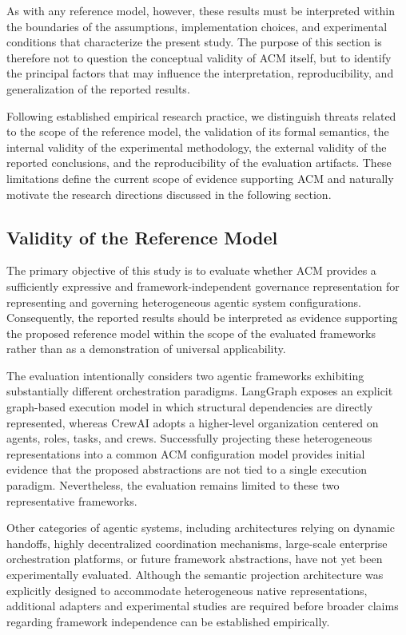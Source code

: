 \documentclass[10pt]{article}
\begin{document}
As with any reference model, however, these results must be interpreted within the boundaries of the assumptions, implementation choices, and experimental conditions that characterize the present study. The purpose of this section is therefore not to question the conceptual validity of ACM itself, but to identify the principal factors that may influence the interpretation, reproducibility, and generalization of the reported results.

Following established empirical research practice, we distinguish threats related to the scope of the reference model, the validation of its formal semantics, the internal validity of the experimental methodology, the external validity of the reported conclusions, and the reproducibility of the evaluation artifacts. These limitations define the current scope of evidence supporting ACM and naturally motivate the research directions discussed in the following section.

\subsection{Validity of the Reference Model}
\label{sec:validity_reference_model}

The primary objective of this study is to evaluate whether ACM provides a sufficiently expressive and framework-independent governance representation for representing and governing heterogeneous agentic system configurations. Consequently, the reported results should be interpreted as evidence supporting the proposed reference model within the scope of the evaluated frameworks rather than as a demonstration of universal applicability.

The evaluation intentionally considers two agentic frameworks exhibiting substantially different orchestration paradigms. LangGraph exposes an explicit graph-based execution model in which structural dependencies are directly represented, whereas CrewAI adopts a higher-level organization centered on agents, roles, tasks, and crews. Successfully projecting these heterogeneous representations into a common ACM configuration model provides initial evidence that the proposed abstractions are not tied to a single execution paradigm. Nevertheless, the evaluation remains limited to these two representative frameworks.

Other categories of agentic systems, including architectures relying on dynamic handoffs, highly decentralized coordination mechanisms, large-scale enterprise orchestration platforms, or future framework abstractions, have not yet been experimentally evaluated. Although the semantic projection architecture was explicitly designed to accommodate heterogeneous native representations, additional adapters and experimental studies are required before broader claims regarding framework independence can be established empirically.
\end{document}
